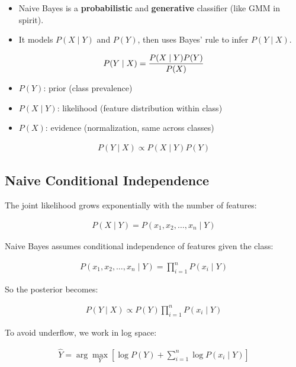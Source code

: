 \documentclass[10pt,a4paper]{article}
\begin{document}
		\begin{itemize}
			\item Naive Bayes is a \textbf{probabilistic} and \textbf{generative} classifier (like GMM in spirit).
			\item It models $P(X\mid Y)$ and $P(Y)$, then uses Bayes' rule to infer $P(Y\mid X)$.
		\end{itemize}
	
		\begin{align*}
			\Large P(Y\mid X) = \frac{P(X\mid Y) P(Y)}{P(X)}
		\end{align*}
	
		\begin{itemize}
			\item $P(Y)$: prior (class prevalence)
			\item $P(X\mid Y)$: likelihood (feature distribution within class)
			\item $P(X)$: evidence (normalization, same across classes)
		\end{itemize}
	
		\begin{align*}
			P(Y\mid X) \propto P(X\mid Y) P(Y)
		\end{align*}
	
		\subsection{Naive Conditional Independence}
		The joint likelihood grows exponentially with the number of features:
	
		\begin{align*}
			P(X\mid Y) = P(x_1,x_2,\dots,x_n\mid Y)
		\end{align*}
	
		Naive Bayes assumes conditional independence of features given the class:
	
		\begin{align*}
			P(x_1,x_2,\dots,x_n\mid Y) = \prod_{i=1}^{n} P(x_i\mid Y)
		\end{align*}
	
		So the posterior becomes:
	
		\begin{align*}
			P(Y\mid X) \propto P(Y) \prod_{i=1}^{n} P(x_i\mid Y)
		\end{align*}
	
		To avoid underflow, we work in log space:
	
		\begin{align*}
			\hat{Y}=\arg\max_{Y}\left[\log P(Y)+\sum_{i=1}^{n} \log P(x_i \mid Y)\right]
		\end{align*}
	
\end{document}
